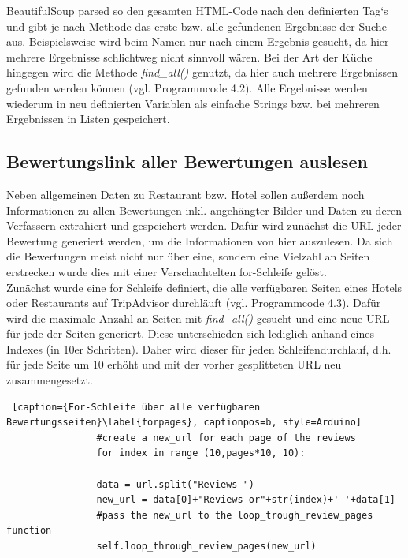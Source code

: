 \documentclass[a4paper,oneside,12pt]{report}
\begin{document}
				BeautifulSoup parsed so den gesamten HTML-Code nach den definierten Tag‘s und gibt je nach Methode das erste bzw. alle gefundenen Ergebnisse der Suche aus. Beispielsweise wird beim Namen nur nach einem Ergebnis gesucht, da hier mehrere Ergebnisse schlichtweg nicht sinnvoll wären. Bei der Art der Küche hingegen wird die Methode \textit{find\_all()} genutzt, da hier auch mehrere Ergebnissen gefunden werden können (vgl. Programmcode 4.2). Alle Ergebnisse werden wiederum in neu definierten Variablen als einfache Strings bzw. bei mehreren Ergebnissen in Listen gespeichert.
	
	
			\subsection{Bewertungslink aller Bewertungen auslesen}
			
				Neben allgemeinen Daten zu Restaurant bzw. Hotel sollen außerdem noch Informationen zu allen Bewertungen inkl. angehängter Bilder und Daten zu deren Verfassern extrahiert und gespeichert werden. Dafür wird zunächst die URL jeder Bewertung generiert werden, um die Informationen von hier auszulesen. Da sich die Bewertungen meist nicht nur über eine, sondern eine Vielzahl an Seiten erstrecken wurde dies mit einer Verschachtelten for-Schleife gelöst.
				\\
				\newline
				Zunächst wurde eine for Schleife definiert, die alle verfügbaren Seiten eines Hotels oder Restaurants auf TripAdvisor durchläuft (vgl. Programmcode 4.3). Dafür wird die maximale Anzahl an Seiten mit \textit{find\_all()} gesucht und eine neue URL für jede der Seiten generiert. Diese unterschieden sich lediglich anhand eines Indexes (in 10er Schritten). Daher wird dieser für jeden Schleifendurchlauf, d.h. für jede Seite um 10 erhöht und mit der vorher gesplitteten URL neu zusammengesetzt. 
				\\
				\begin{lstlisting} [caption={For-Schleife über alle verfügbaren Bewertungsseiten}\label{forpages}, captionpos=b, style=Arduino]
				#create a new_url for each page of the reviews
				for index in range (10,pages*10, 10):
				
				data = url.split("Reviews-")
				new_url = data[0]+"Reviews-or"+str(index)+'-'+data[1]
				#pass the new_url to the loop_trough_review_pages function
				self.loop_through_review_pages(new_url)
				\end{lstlisting}
				
\end{document}
